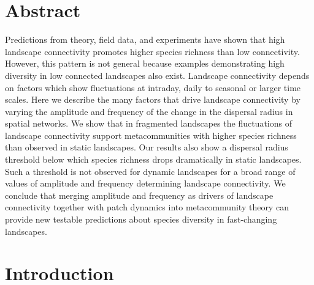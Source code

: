 \documentclass[12pt]{article}
\begin{document}
\newpage
    \section*{Abstract}
    Predictions from theory, field data, and experiments have shown that high landscape connectivity promotes higher species richness than low connectivity. However, this pattern is not general because examples demonstrating high diversity in low connected landscapes also exist. Landscape connectivity depends on factors which show fluctuations at intraday, daily to seasonal or larger time scales. Here we describe the many factors that drive landscape connectivity by varying the amplitude and frequency of the change in the dispersal radius in spatial networks. We show that in fragmented landscapes the fluctuations of landscape connectivity support metacommunities with higher species richness than observed in static landscapes. Our results also show a dispersal radius threshold below which species richness drops dramatically in static landscapes. Such a threshold is not observed for dynamic landscapes for a broad range of values of amplitude and frequency determining landscape connectivity. We conclude that merging amplitude and frequency as drivers of landscape connectivity together with patch dynamics into metacommunity theory can provide new testable predictions about species diversity in fast-changing landscapes.
    
    \newpage
    \section*{Introduction}
    
\end{document}
